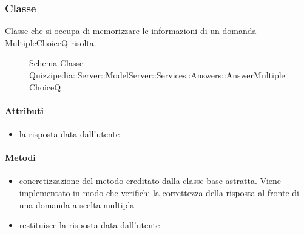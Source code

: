 \subsubsection{Classe }
Classe che si occupa di memorizzare le informazioni di un domanda MultipleChoiceQ risolta.
\begin{figure}[H]
\centering
\noindent{}
\caption[Schema Classe AnswerMultipleChoiceQ]{Schema Classe Quizzipedia::Server::ModelServer::Services::Answers::AnswerMultipleChoiceQ}
\end{figure}
\paragraph{Attributi}
\begin{itemize}
\item {}
\newline
la risposta data dall'utente
\end{itemize}
\paragraph{Metodi}
\begin{itemize}
\item {}
\newline
concretizzazione del metodo ereditato dalla classe base astratta. Viene implementato in modo che verifichi la correttezza della risposta al fronte di una domanda a scelta multipla
\newline
\item {}
\newline
restituisce la risposta data dall'utente
\newline
\end{itemize}
